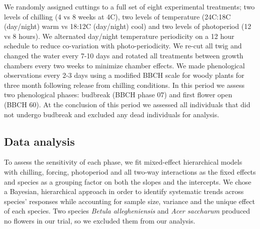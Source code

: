 \documentclass[11pt]{article}
\begin{document}
\noindent We randomly assigned cuttings to a full set of eight experimental treatments; two levels of chilling (4 vs 8 weeks at 4\degree C), two levels of temperature (24\degree C:18\degree C (day/night) warm vs 18\degree:12\degree C (day/night) cool) and two levels of photoperiod (12 vs 8 hours). We alternated day/night temperature periodicity on a 12 hour schedule to reduce co-variation with photo-periodicity. We re-cut all twig and changed the water every 7-10 days and rotated all treatments between growth chambers every two weeks to minimize chamber effects. We made phenological observations every 2-3 days using a modified BBCH scale for woody plants \citep{Finn2007} for three month following release from chilling conditions. In this period we assess two phenological phases: budbreak (BBCH phase 07)%
and first flower open (BBCH 60). At the conclusion of this period we assessed all individuals that did not undergo budbreak and excluded any dead individuals for analysis.

\subsection*{Data analysis}
\noindent To assess the sensitivity of each phase, we fit mixed-effect hierarchical models with chilling, forcing, photoperiod and all two-way interactions as the fixed effects and species as a grouping factor on both the slopes and the intercepts. We chose a Bayesian, hierarchical approach in order to identify systematic trends across species' responses while accounting for sample size, variance and the unique effect of each species. Two species \textit{Betula allegheniensis} and \textit{Acer saccharum} produced no flowers in our trial, so we excluded them from our analysis.\\

\end{document}
